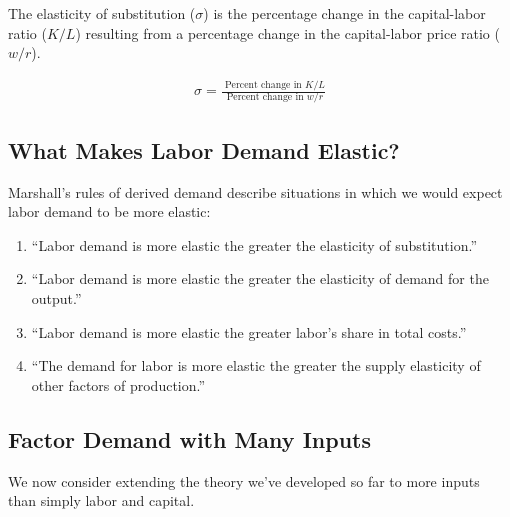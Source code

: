\FloatBarrier



\begin{definition}

    The elasticity of substitution ($\sigma$)
    is the percentage change in the
    capital-labor ratio ($K/L$)
    resulting from a percentage change in the
    capital-labor price ratio ($w/r$).
    
    \begin{align}
        \sigma=\frac{\text { Percent change in } K / L}{\text { Percent change in } w / r}
    \end{align}
    
\end{definition}


\subsection{What Makes Labor Demand Elastic?}


Marshall's rules of derived demand 
describe situations in which we would 
expect labor demand to be more elastic: 

\begin{enumerate}
    \item ``Labor demand is more elastic the greater the elasticity of substitution.''
    \item ``Labor demand is more elastic the greater the elasticity of demand for the output.''
    \item ``Labor demand is more elastic the greater labor's share in total costs.''
    \item ``The demand for labor is more elastic the greater the supply elasticity of other factors of production.''
\end{enumerate}


\subsection{Factor Demand with Many Inputs}

We now consider
extending the theory we've developed so far 
to more inputs than simply labor and capital.

